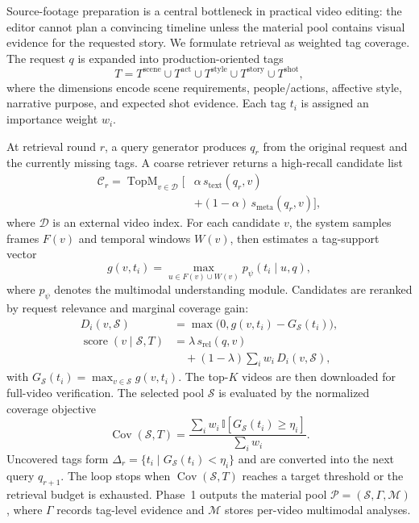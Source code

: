 ﻿\documentclass[11pt]{article}
\begin{document}
Source-footage preparation is a central bottleneck in practical video editing:
the editor cannot plan a convincing timeline unless the material pool contains
visual evidence for the requested story. We formulate retrieval as weighted tag
coverage. The request $q$ is expanded into production-oriented tags
\[
    T = T^{\mathrm{scene}} \cup T^{\mathrm{act}}
      \cup T^{\mathrm{style}} \cup T^{\mathrm{story}}
      \cup T^{\mathrm{shot}},
\]
where the dimensions encode scene requirements, people/actions, affective
style, narrative purpose, and expected shot evidence. Each tag $t_i$ is assigned
an importance weight $w_i$.

At retrieval round $r$, a query generator produces $q_r$ from the original
request and the currently missing tags. A coarse retriever returns a high-recall
candidate list
\[
    \begin{aligned}
    \mathcal{C}_r =
    \operatorname{TopM}_{v\in\mathcal{D}}
    \bigl[&
    \alpha\,s_{\mathrm{text}}(q_r,v)\\
    &+(1-\alpha)\,s_{\mathrm{meta}}(q_r,v)
    \bigr],
    \end{aligned}
\]
where $\mathcal{D}$ is an external video index. For each candidate $v$, the
system samples frames $F(v)$ and temporal windows $W(v)$, then estimates a
tag-support vector
\[
    g(v,t_i)=
    \max_{u\in F(v)\cup W(v)}
    p_{\psi}(t_i \mid u,q),
\]
where $p_{\psi}$ denotes the multimodal understanding module. Candidates are
reranked by request relevance and marginal coverage gain:
\[
    \begin{aligned}
    D_i(v,\mathcal{S})
    &= \max\bigl(0,g(v,t_i)-G_{\mathcal{S}}(t_i)\bigr),\\
    \operatorname{score}(v\mid\mathcal{S},T)
    &= \lambda\,s_{\mathrm{rel}}(q,v)\\
    &\quad +(1-\lambda)\sum_i w_i\,D_i(v,\mathcal{S}),
    \end{aligned}
\]
with $G_{\mathcal{S}}(t_i)=\max_{v\in\mathcal{S}}g(v,t_i)$. The top-$K$
videos are then downloaded for full-video verification. The selected pool
$\mathcal{S}$ is evaluated by the normalized coverage objective
\[
    \operatorname{Cov}(\mathcal{S},T)
    =\frac{\sum_i w_i\,\mathbb{I}[G_{\mathcal{S}}(t_i)\ge \eta_i]}
           {\sum_i w_i}.
\]
Uncovered tags form $\Delta_r=\{t_i\mid G_{\mathcal{S}}(t_i)<\eta_i\}$ and are
converted into the next query $q_{r+1}$. The loop stops when
$\operatorname{Cov}(\mathcal{S},T)$ reaches a target threshold or the retrieval
budget is exhausted. Phase~1 outputs the material pool
$\mathcal{P}=(\mathcal{S},\Gamma,\mathcal{M})$, where $\Gamma$ records
tag-level evidence and $\mathcal{M}$ stores per-video multimodal analyses.
\end{document}

